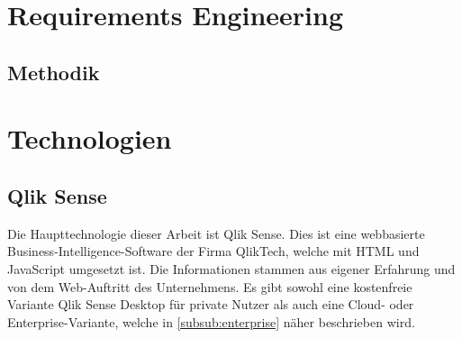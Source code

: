 

\section{Requirements Engineering}
\subsection{Methodik}

\section{Technologien}
\subsection{Qlik Sense}
\label{sub:qlik}
Die Haupttechnologie dieser Arbeit ist Qlik Sense.
Dies ist eine webbasierte Business-Intelligence-Software der Firma QlikTech, welche mit HTML und JavaScript umgesetzt ist.
Die Informationen stammen aus eigener Erfahrung und von dem Web-Auftritt \cite{QlikTech.2019} des Unternehmens. 
Es gibt sowohl eine kostenfreie Variante Qlik Sense Desktop für private Nutzer als auch eine Cloud- oder Enterprise-Variante, welche in \ref{subsub:enterprise} näher beschrieben wird.

